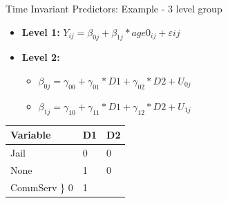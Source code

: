 \begin{frame}{Time Invariant Predictors: Example - 3 level group}

\begin{itemize}
  \item \textbf{Level 1:} $Y_{ij} = \beta_{0j} + \beta_{1j}*age0_{ij} + \varepsilon{ij}$
  \item \textbf{Level 2:} 
    \begin{itemize} 
      \item $\beta_{0j} = \gamma_{00} + \gamma_{01}*D1 + \gamma_{02}*D2 + U_{0j}$
      \item $\beta_{1j} = \gamma_{10} + \gamma_{11}*D1 + \gamma_{12}*D2 + U_{1j}$
    \end{itemize}
\end{itemize}

\begin{longtable}[]{@{}lll@{}}
\toprule
Variable & D1 & D2\tabularnewline
\midrule
\endhead
Jail & 0 & 0\tabularnewline
None & 1 & 0\tabularnewline
CommServ \} 0 & 1\tabularnewline
\bottomrule
\end{longtable}

\end{frame}

